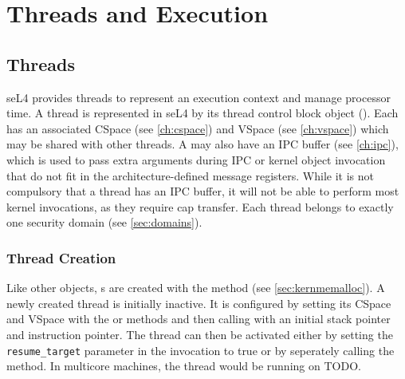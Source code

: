 %
%
%
%

\chapter{\label{ch:threads}Threads and Execution}

\section{Threads}
\label{sec:threads}

seL4 provides threads to represent an execution context and manage
processor time. A thread is represented in seL4 by its thread control block
object (). Each  has an associated CSpace (see
\autoref{ch:cspace}) and VSpace (see \autoref{ch:vspace}) which
may be shared with other threads. A  may also have an IPC buffer
(see  \autoref{ch:ipc}), which is used to pass extra arguments during IPC
or kernel object invocation that do not fit in the architecture-defined message
registers. While it is not compulsory that a thread has an IPC buffer,
it will not be able to perform most kernel invocations, as they require
cap transfer.
Each thread belongs to exactly one security domain (see
\autoref{sec:domains}).

\subsection{Thread Creation}
\label{sec:thread_creation}

Like other objects, s are created with the
 method (see
\autoref{sec:kernmemalloc}). A newly created thread is initially inactive. It
is configured by setting its CSpace and VSpace with the
or  methods and then calling
 with an initial stack pointer and instruction
pointer. The thread can then be activated either by setting the
\texttt{resume\_target} parameter in the  invocation to true
or by seperately calling the  method. In multicore machines, the thread
would be running on TODO.

